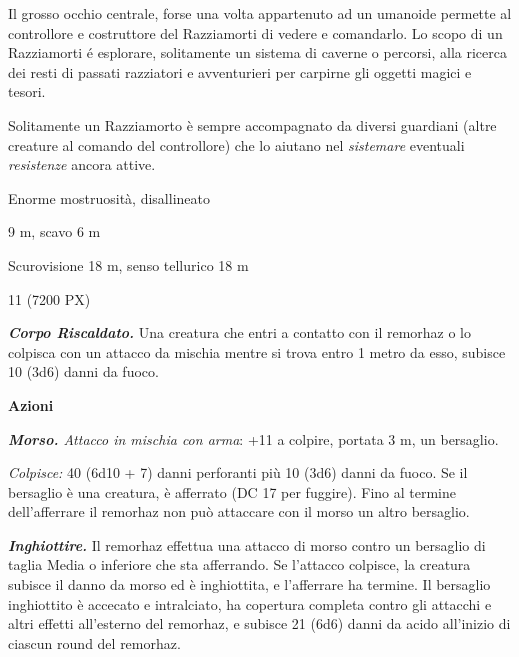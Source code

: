 \begin{multicols}{2}
{Il grosso occhio centrale, forse una volta appartenuto ad un umanoide permette al controllore e costruttore del Razziamorti di vedere e comandarlo. Lo scopo di un Razziamorti é esplorare, solitamente un sistema di caverne o percorsi, alla ricerca dei resti di passati razziatori e avventurieri per carpirne gli oggetti magici e tesori.

Solitamente un Razziamorto è sempre accompagnato da diversi guardiani (altre creature al comando del controllore) che lo aiutano nel \emph{sistemare} eventuali \emph{resistenze} ancora attive.

\begin{description}[noitemsep, topsep=0pt, parsep=0pt, partopsep=0pt, itemsep=1pt, leftmargin=2.35cm,  labelwidth=2.2cm, itemindent=0cm, listparindent=0pt] %
\setlength{\baselineskip}{10pt}
\item[\textbf{Taglia/Tipo}] Enorme mostruosità, disallineato
\item[\textbf{Caratt.}] 
\item[\textbf{Punti Ferita}] 
\item[\textbf{Movimento}] 9 m, scavo 6 m
\item[\textbf{Tiri Salvez.}] 
\item[\textbf{Sensi}] Scurovisione 18 m, senso tellurico 18 m
\item[\textbf{Sfida}] 11 (7200 PX)
\end{description}
\smallskip

\emph{\textbf{Corpo Riscaldato.}} Una creatura che entri a contatto con il remorhaz o lo colpisca con un attacco da mischia mentre si trova entro 1 metro da esso, subisce 10 (3d6) danni da fuoco.

\textbf{Azioni}

\emph{\textbf{Morso.} Attacco in mischia con arma}: +11 a colpire, portata 3 m, un bersaglio.

\emph{Colpisce:} 40 (6d10 + 7) danni perforanti più 10 (3d6) danni da fuoco. Se il bersaglio è una creatura, è afferrato (DC 17 per fuggire). Fino al termine dell'afferrare  il remorhaz non può attaccare con il morso un altro bersaglio.

\emph{\textbf{Inghiottire.}} Il remorhaz effettua una attacco di morso contro un bersaglio di taglia Media o inferiore che sta afferrando. Se l'attacco colpisce, la creatura subisce il danno da morso ed è inghiottita, e l'afferrare ha termine. Il bersaglio inghiottito è accecato e intralciato, ha copertura completa contro gli attacchi e altri effetti all'esterno del remorhaz, e subisce 21 (6d6) danni da acido all'inizio di ciascun round del remorhaz.

}
\end{multicols}
